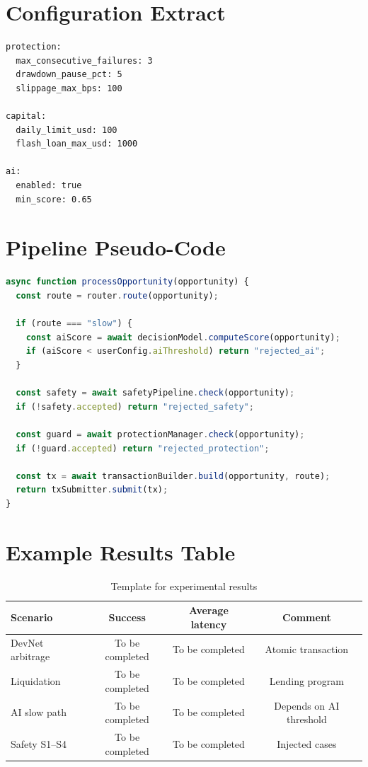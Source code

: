 \documentclass[12pt,a4paper]{report}
\begin{document}
\begin{appendices}

\chapter{Configuration Extract}

\begin{lstlisting}[caption={Example of strategy parameters}]
protection:
  max_consecutive_failures: 3
  drawdown_pause_pct: 5
  slippage_max_bps: 100

capital:
  daily_limit_usd: 100
  flash_loan_max_usd: 1000

ai:
  enabled: true
  min_score: 0.65
\end{lstlisting}

\chapter{Pipeline Pseudo-Code}

\begin{lstlisting}[language=JavaScript, caption={Simplified pipeline}]
async function processOpportunity(opportunity) {
  const route = router.route(opportunity);

  if (route === "slow") {
    const aiScore = await decisionModel.computeScore(opportunity);
    if (aiScore < userConfig.aiThreshold) return "rejected_ai";
  }

  const safety = await safetyPipeline.check(opportunity);
  if (!safety.accepted) return "rejected_safety";

  const guard = await protectionManager.check(opportunity);
  if (!guard.accepted) return "rejected_protection";

  const tx = await transactionBuilder.build(opportunity, route);
  return txSubmitter.submit(tx);
}
\end{lstlisting}

\chapter{Example Results Table}

\begin{table}[H]
\centering
\begin{tabular}{lccc}
\toprule
\textbf{Scenario} & \textbf{Success} & \textbf{Average latency} & \textbf{Comment} \\
\midrule
DevNet arbitrage & To be completed & To be completed & Atomic transaction \\
Liquidation & To be completed & To be completed & Lending program \\
AI slow path & To be completed & To be completed & Depends on AI threshold \\
Safety S1--S4 & To be completed & To be completed & Injected cases \\
\bottomrule
\end{tabular}
\caption{Template for experimental results}
\end{table}

\end{appendices}
\end{document}
